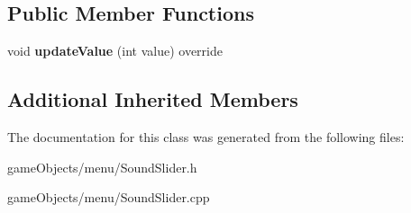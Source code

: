 \subsection*{Public Member Functions}
\begin{DoxyCompactItemize}
\item 
\hypertarget{class_sound_slider_ab459445dc7b47e61079a8e6d453909f9}{void {\bfseries update\+Value} (int value) override}\label{class_sound_slider_ab459445dc7b47e61079a8e6d453909f9}

\end{DoxyCompactItemize}
\subsection*{Additional Inherited Members}


The documentation for this class was generated from the following files\+:\begin{DoxyCompactItemize}
\item 
game\+Objects/menu/Sound\+Slider.\+h\item 
game\+Objects/menu/Sound\+Slider.\+cpp\end{DoxyCompactItemize}
